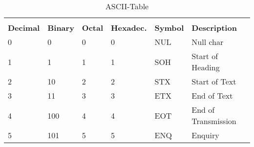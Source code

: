 \begin{center}
\begin{longtable}{llllll}
\caption{ASCII-Table \cite{ascii}} \label{ascii_table} \\
\vspace{0em} \\

\rowcolor[HTML]{FCFCFC} 
{\color[HTML]{404040} \textbf{Decimal}} & {\color[HTML]{404040} \textbf{Binary}} & {\color[HTML]{404040} \textbf{Octal}} & {\color[HTML]{404040} \textbf{Hexadec.}} & {\color[HTML]{404040} \textbf{Symbol}}    & {\color[HTML]{404040} \textbf{Description}}                  \\
\endfirsthead
%
\endhead
%
\rowcolor[HTML]{F3F6F6} 
{\color[HTML]{404040} 0}                & {\color[HTML]{404040} 0}               & {\color[HTML]{404040} 0}              & {\color[HTML]{404040} 0}                    & {\color[HTML]{404040} NUL}                & {\color[HTML]{404040} Null char}                             \\
\rowcolor[HTML]{FCFCFC} 
{\color[HTML]{404040} 1}                & {\color[HTML]{404040} 1}               & {\color[HTML]{404040} 1}              & {\color[HTML]{404040} 1}                    & {\color[HTML]{404040} SOH}                & {\color[HTML]{404040} Start of Heading}                      \\
\rowcolor[HTML]{F3F6F6} 
{\color[HTML]{404040} 2}                & {\color[HTML]{404040} 10}              & {\color[HTML]{404040} 2}              & {\color[HTML]{404040} 2}                    & {\color[HTML]{404040} STX}                & {\color[HTML]{404040} Start of Text}                         \\
\rowcolor[HTML]{FCFCFC} 
{\color[HTML]{404040} 3}                & {\color[HTML]{404040} 11}              & {\color[HTML]{404040} 3}              & {\color[HTML]{404040} 3}                    & {\color[HTML]{404040} ETX}                & {\color[HTML]{404040} End of Text}                           \\
\rowcolor[HTML]{F3F6F6} 
{\color[HTML]{404040} 4}                & {\color[HTML]{404040} 100}             & {\color[HTML]{404040} 4}              & {\color[HTML]{404040} 4}                    & {\color[HTML]{404040} EOT}                & {\color[HTML]{404040} End of Transmission}                   \\
\rowcolor[HTML]{FCFCFC} 
{\color[HTML]{404040} 5}                & {\color[HTML]{404040} 101}             & {\color[HTML]{404040} 5}              & {\color[HTML]{404040} 5}                    & {\color[HTML]{404040} ENQ}                & {\color[HTML]{404040} Enquiry}                               \\

\end{longtable}
\end{center}
